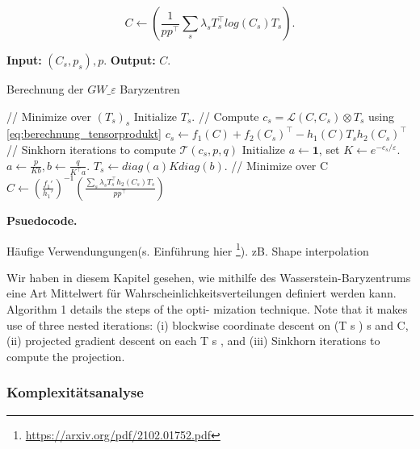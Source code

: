 \documentclass[11pt,a4paper]{article}
\numberwithin{equation}{section}
\begin{document}
	\begin{equation}
	C \leftarrow \left(\frac{1}{pp^\top}\sum_s{\lambda_s T_s^\top log(C_s)T_s}\right).
	\end{equation}
	\begin{algorithm}
		\hspace*{\algorithmicindent} \textbf{Input: } $(C_s,p_s), p.$ \newline
		\hspace*{\algorithmicindent} \textbf{Output: } $C$. 
		\caption{Berechnung der $GW\_{\varepsilon}$ Baryzentren}
		\label{alg:GWB_computation}
		\begin{algorithmic}
			\REPEAT 
			\STATE// Minimize over $(T_s)_s$
			\STATE Initialize $T_s$.
			\REPEAT
			\STATE // Compute $c_s = \mathcal{L}(C,C_s)\otimes T_s$ using \autoref*{eq:berechnung_tensorprodukt}
			\STATE $c_s \leftarrow f_1(C) + f_2(C_s)^\top -h_1(C)T_sh_2(C_s)^\top$
			\STATE // Sinkhorn iterations to compute $\mathcal{T}(c_s,p,q)$
			\STATE Initialize $a \leftarrow \boldsymbol{1}$, set $K \leftarrow e^{-c_s/\varepsilon}.$
			\REPEAT 
			\STATE $a \leftarrow \frac{p}{Kb}, b \leftarrow  \frac{q}{K^\top a}.$
			\STATE $T_s \leftarrow diag(a)Kdiag(b).$
			\ENDFOR 
			\STATE // Minimize over C 
			\STATE $C \leftarrow \left( \frac{f_1'}{h_1'} \right)^{-1}\left( \frac{\sum_s{\lambda_sT_s^\top h_2(C_s)T_s}}{pp^\top} \right)$ 
		\end{algorithmic}
	\end{algorithm}
	
	\noindent \textbf{Psuedocode.}
	
	Häufige Verwendungungen(s. Einführung hier \footnote{\url{https://arxiv.org/pdf/2102.01752.pdf}}). zB. Shape interpolation
	
	Wir haben in diesem Kapitel gesehen, wie mithilfe des Wasserstein-Baryzentrums eine Art Mittelwert für Wahrscheinlichkeitsverteilungen definiert werden kann.\\
	Algorithm 1 details the steps of the opti-
	mization technique. Note that it makes use of three nested
	iterations: (i) blockwise coordinate descent on (T s ) s and
	C, (ii) projected gradient descent on each T s , and (iii)
	Sinkhorn iterations to compute the projection.
	\subsubsection{Komplexitätsanalyse}
	
\end{document}
